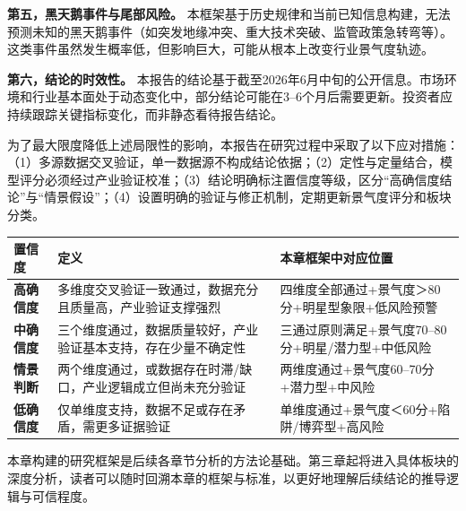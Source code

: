 \textbf{第五，黑天鹅事件与尾部风险。} 本框架基于历史规律和当前已知信息构建，无法预测未知的黑天鹅事件（如突发地缘冲突、重大技术突破、监管政策急转弯等）。这类事件虽然发生概率低，但影响巨大，可能从根本上改变行业景气度轨迹。

\textbf{第六，结论的时效性。} 本报告的结论基于截至2026年6月中旬的公开信息。市场环境和行业基本面处于动态变化中，部分结论可能在3--6个月后需要更新。投资者应持续跟踪关键指标变化，而非静态看待报告结论。

为了最大限度降低上述局限性的影响，本报告在研究过程中采取了以下应对措施：（1）多源数据交叉验证，单一数据源不构成结论依据；（2）定性与定量结合，模型评分必须经过产业验证校准；（3）结论明确标注置信度等级，区分“高确信度结论”与“情景假设”；（4）设置明确的验证与修正机制，定期更新景气度评分和板块分类。

\begin{dashboardbox}[本报告研究结论的置信度分级说明]
\small
\begin{tabularx}{\textwidth}{L{2.2cm} X L{4.5cm}}
\toprule
\textbf{置信度} & \textbf{定义} & \textbf{本章框架中对应位置} \\
\midrule
\textbf{高确信度} & 多维度交叉验证一致通过，数据充分且质量高，产业验证支撑强烈 & 四维度全部通过+景气度＞80分+明星型象限+低风险预警 \\
\textbf{中确信度} & 三个维度通过，数据质量较好，产业验证基本支持，存在少量不确定性 & 三通过原则满足+景气度70--80分+明星/潜力型+中低风险 \\
\textbf{情景判断} & 两个维度通过，或数据存在时滞/缺口，产业逻辑成立但尚未充分验证 & 两维度通过+景气度60--70分+潜力型+中风险 \\
\textbf{低确信度} & 仅单维度支持，数据不足或存在矛盾，需更多证据验证 & 单维度通过+景气度＜60分+陷阱/博弈型+高风险 \\
\bottomrule
\end{tabularx}
\end{dashboardbox}

本章构建的研究框架是后续各章节分析的方法论基础。第三章起将进入具体板块的深度分析，读者可以随时回溯本章的框架与标准，以更好地理解后续结论的推导逻辑与可信程度。
